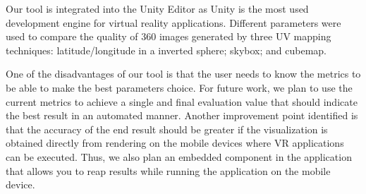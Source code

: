 \documentclass[12pt]{article}
\begin{document}
Our tool is integrated into the Unity Editor as Unity is the most used development engine for virtual reality applications. Different parameters were used to compare the quality of 360 images generated by three UV mapping techniques:  latitude/longitude in a inverted sphere; skybox; and cubemap.

One of the disadvantages of our tool is that the user needs to know the metrics to be able to make the best parameters choice. For future work, we plan to use the current metrics to achieve a single and final evaluation value that should indicate the best result in an automated manner. Another improvement point identified is that the accuracy of the end result should be greater if the visualization is obtained directly from rendering on the mobile devices where VR applications can be executed. Thus, we also plan an embedded component in the application that allows you to reap results while running the application on the mobile device.



\end{document}
